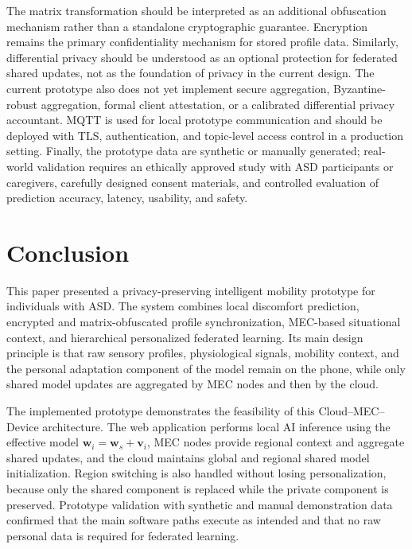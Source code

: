 \documentclass[lettersize,journal]{IEEEtran}
\begin{document}
The matrix transformation should be interpreted as an additional
obfuscation mechanism rather than a standalone cryptographic guarantee.
Encryption remains the primary confidentiality mechanism for stored
profile data. Similarly, differential privacy should be understood as an
optional protection for federated shared updates, not as the foundation
of privacy in the current design. The current prototype also does not
yet implement secure aggregation, Byzantine-robust aggregation, formal
client attestation, or a calibrated differential privacy accountant.
MQTT is used for local prototype communication and should be deployed
with TLS, authentication, and topic-level access control in a production
setting. Finally, the prototype data are synthetic or manually
generated; real-world validation requires an ethically approved study
with ASD participants or caregivers, carefully designed consent
materials, and controlled evaluation of prediction accuracy, latency,
usability, and safety.

\section{Conclusion}

This paper presented a privacy-preserving intelligent mobility
prototype for individuals with ASD. The system combines local
discomfort prediction, encrypted and matrix-obfuscated profile
synchronization, MEC-based situational context, and hierarchical
personalized federated learning. Its main design principle is that raw
sensory profiles, physiological signals, mobility context, and the
personal adaptation component of the model remain on the phone, while
only shared model updates are aggregated by MEC nodes and then by the
cloud.

The implemented prototype demonstrates the feasibility of this
Cloud--MEC--Device architecture. The web application performs local AI
inference using the effective model
$\mathbf{w}_i=\mathbf{w}_s+\mathbf{v}_i$, MEC nodes provide regional
context and aggregate shared updates, and the cloud maintains global and
regional shared model initialization. Region switching is also handled
without losing personalization, because only the shared component is
replaced while the private component is preserved. Prototype validation
with synthetic and manual demonstration data confirmed that the main
software paths execute as intended and that no raw personal data is
required for federated learning.
\end{document}
